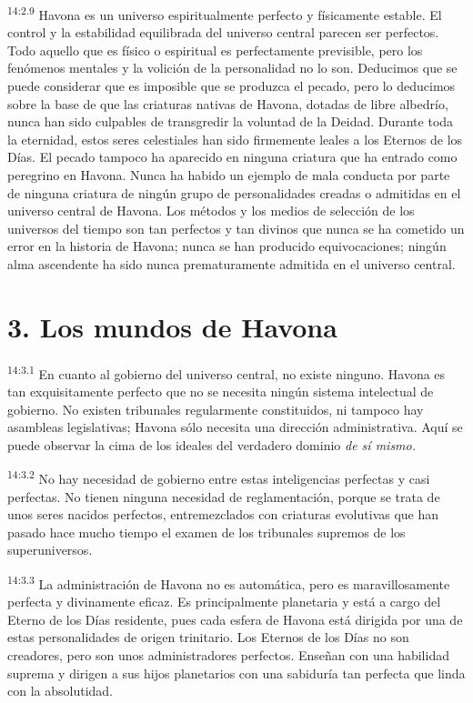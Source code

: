 \par
\textsuperscript{14:2.9} Havona es un universo espiritualmente perfecto y físicamente estable. El control y la estabilidad equilibrada del universo central parecen ser perfectos. Todo aquello que es físico o espiritual es perfectamente previsible, pero los fenómenos mentales y la volición de la personalidad no lo son. Deducimos que se puede considerar que es imposible que se produzca el pecado, pero lo deducimos sobre la base de que las criaturas nativas de Havona, dotadas de libre albedrío, nunca han sido culpables de transgredir la voluntad de la Deidad. Durante toda la eternidad, estos seres celestiales han sido firmemente leales a los Eternos de los Días. El pecado tampoco ha aparecido en ninguna criatura que ha entrado como peregrino en Havona. Nunca ha habido un ejemplo de mala conducta por parte de ninguna criatura de ningún grupo de personalidades creadas o admitidas en el universo central de Havona. Los métodos y los medios de selección de los universos del tiempo son tan perfectos y tan divinos que nunca se ha cometido un error en la historia de Havona; nunca se han producido equivocaciones; ningún alma ascendente ha sido nunca prematuramente admitida en el universo central.

\section*{3. Los mundos de Havona}
\par
\textsuperscript{14:3.1} En cuanto al gobierno del universo central, no existe ninguno. Havona es tan exquisitamente perfecto que no se necesita ningún sistema intelectual de gobierno. No existen tribunales regularmente constituidos, ni tampoco hay asambleas legislativas; Havona sólo necesita una dirección administrativa. Aquí se puede observar la cima de los ideales del verdadero dominio \textit{de sí mismo.}

\par
\textsuperscript{14:3.2} No hay necesidad de gobierno entre estas inteligencias perfectas y casi perfectas. No tienen ninguna necesidad de reglamentación, porque se trata de unos seres nacidos perfectos, entremezclados con criaturas evolutivas que han pasado hace mucho tiempo el examen de los tribunales supremos de los superuniversos.

\par
\textsuperscript{14:3.3} La administración de Havona no es automática, pero es maravillosamente perfecta y divinamente eficaz. Es principalmente planetaria y está a cargo del Eterno de los Días residente, pues cada esfera de Havona está dirigida por una de estas personalidades de origen trinitario. Los Eternos de los Días no son creadores, pero son unos administradores perfectos. Enseñan con una habilidad suprema y dirigen a sus hijos planetarios con una sabiduría tan perfecta que linda con la absolutidad.


